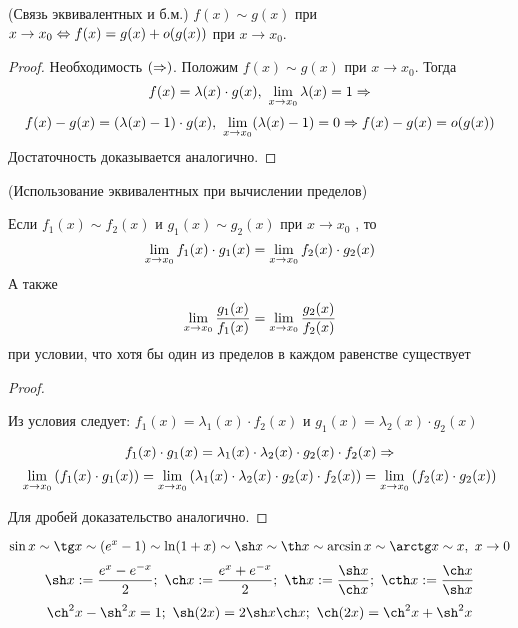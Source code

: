 \begin{theorem} (Связь эквивалентных и б.м.)
	$f(x) \sim g(x)$ при $x \to x_0 \Leftrightarrow f(x) = g(x)
	+ o(g(x))$ при $x \to x_0$.
\end{theorem}

\begin{proof}
	Необходимость $(\Rightarrow)$. Положим $f(x) \sim g(x)$ при $x \to x_0$. Тогда
	\[
		f(x) = \lambda(x) \cdot g(x),\ \liml_{x \to x_0} \lambda(x) = 1 \Ra
	\]
	\[
		f(x) - g(x) = (\lambda(x) - 1) \cdot g(x),\ \liml_{x \to x_0} (\lambda(x) - 1) = 0 \Ra f(x) - g(x) = o(g(x))
	\]
	Достаточность доказывается аналогично. 
\end{proof}

\begin{theorem} (Использование эквивалентных при вычислении пределов)
	
	Если $f_1(x) \sim f_2(x)$ и $g_1(x) \sim 
	g_2(x)$ при $x \to x_0$ , то
	\[
		\lim\limits_{x \to x_0} f_1(x) \cdot g_1(x) =
		\lim\limits_{x \to x_0} f_2(x) \cdot g_2(x)
	\]
	А также
	\[
		\lim\limits_{x \to x_0} \frac{g_1(x)}{f_1(x)} =
		\lim\limits_{x \to x_0} \frac{g_2(x)}{f_2(x)}
	\]
	при условии, что хотя бы один из пределов в
	каждом равенстве существует
\end{theorem}

\begin{proof}~

	Из условия следует: $f_1(x) = \lambda_1(x) \cdot f_2(x)$ и
	$g_1(x) = \lambda_2(x) \cdot g_2(x)$

	\[
		f_1(x) \cdot g_1(x) = \lambda_1(x) \cdot \lambda_2(x) \cdot 
		g_2(x) \cdot f_2(x) \Rightarrow
	\]
	\[
		\lim\limits_{x \to x_0} \left(f_1(x) \cdot g_1(x)\right) =
		\lim\limits_{x \to x_0} \left(\lambda_1(x) \cdot \lambda_2(x) \cdot 
		g_2(x) \cdot f_2(x)\right) = \lim\limits_{x \to x_0}
		\left(f_2(x) \cdot g_2(x)\right)
	\]
	
	Для дробей доказательство аналогично.
\end{proof}

\begin{proposition}
	\[
		\sin x \sim \tg x \sim (e^x - 1) \sim \ln(1 + x)
		\sim \sh x \sim \th x \sim \arcsin x \sim \arctg x
		\sim x,\ x \to 0
	\]
	\[
		\sh x := \frac{e^x - e^{-x}}{2};\ 
		\ch x := \frac{e^x + e^{-x}}{2};\ 
		\th x := \frac{\sh x}{\ch x};\ 
		\cth x := \frac{\ch x}{\sh x}
	\]
	\[
		\ch^2 x - \sh^2 x = 1;\ \sh(2x) = 2 \sh x \ch x;
		\ \ch(2x) = \ch^2 x + \sh^2 x
	\]
\end{proposition}




